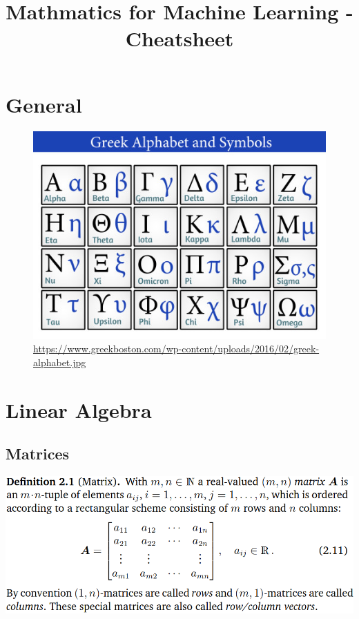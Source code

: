 \documentclass[oneside,10pt]{scrartcl}
\title{Mathmatics for Machine Learning - Cheatsheet}
\author{}
\date{}
\begin{document}
\maketitle
\tableofcontents
\newpage
{}
\footnotesize

\begin{multicols*}{2}
\section{General}

\begin{figure}[H]
\centering
\includegraphics[width=\linewidth]{greek-alphabet}
\caption{\url{https://www.greekboston.com/wp-content/uploads/2016/02/greek-alphabet.jpg}} \label{fig:greek_alphabet}
\end{figure}

\newpage

\section{Linear Algebra}

\subsection{Matrices}
\includegraphics[width=\linewidth]{2.2}


\end{multicols*}
\end{document}
